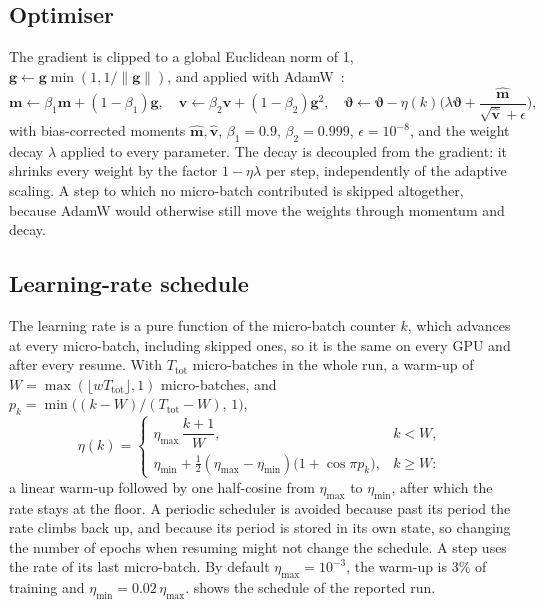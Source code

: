 \documentclass[11pt,a4paper]{article}
\theoremstyle{remark}
\newcommand{\norm}[1]{\lVert #1\rVert}
\begin{document}
\subsection{Optimiser}
The gradient is clipped to a global Euclidean norm of 1, $\mathbf g\leftarrow\mathbf g\min(1,1/\norm{\mathbf g})$, and applied with AdamW~\cite{loshchilov2019adamw}:
\begin{equation}
  \mathbf m\leftarrow\beta_1\mathbf m+(1-\beta_1)\mathbf g,\quad
  \mathbf v\leftarrow\beta_2\mathbf v+(1-\beta_2)\mathbf g^2,\quad
  \boldsymbol\vartheta\leftarrow\boldsymbol\vartheta-\eta(k)\Big(\lambda\boldsymbol\vartheta+\frac{\hat{\mathbf m}}{\sqrt{\hat{\mathbf v}}+\epsilon}\Big),
\end{equation}
with bias-corrected moments $\hat{\mathbf m},\hat{\mathbf v}$, $\beta_1=0.9$, $\beta_2=0.999$, $\epsilon=10^{-8}$, and the weight decay $\lambda$ applied to every parameter. The decay is decoupled from the gradient: it shrinks every weight by the factor $1-\eta\lambda$ per step, independently of the adaptive scaling. A step to which no micro-batch contributed is skipped altogether, because AdamW would otherwise still move the weights through momentum and decay.

\subsection{Learning-rate schedule}
\label{sec:lr}
The learning rate is a pure function of the micro-batch counter $k$, which advances at every micro-batch, including skipped ones, so it is the same on every GPU and after every resume. With $T_{\mathrm{tot}}$ micro-batches in the whole run, a warm-up of $W=\max(\lfloor wT_{\mathrm{tot}}\rfloor,1)$ micro-batches, and $p_k=\min\big((k-W)/(T_{\mathrm{tot}}-W),\,1\big)$,
\begin{equation}
  \eta(k)=\begin{cases}
  \eta_{\max}\,\dfrac{k+1}{W}, & k<W,\\[6pt]
  \eta_{\min}+\tfrac12(\eta_{\max}-\eta_{\min})\big(1+\cos\pi p_k\big), & k\ge W:
  \end{cases}
\end{equation}
a linear warm-up followed by one half-cosine from $\eta_{\max}$ to $\eta_{\min}$, after which the rate stays at the floor. A periodic scheduler is avoided because past its period the rate climbs back up, and because its period is stored in its own state, so changing the number of epochs when resuming might not change the schedule. A step uses the rate of its last micro-batch. By default $\eta_{\max}=10^{-3}$, the warm-up is 3\% of training and $\eta_{\min}=0.02\,\eta_{\max}$.  shows the schedule of the reported run.
\end{document}
